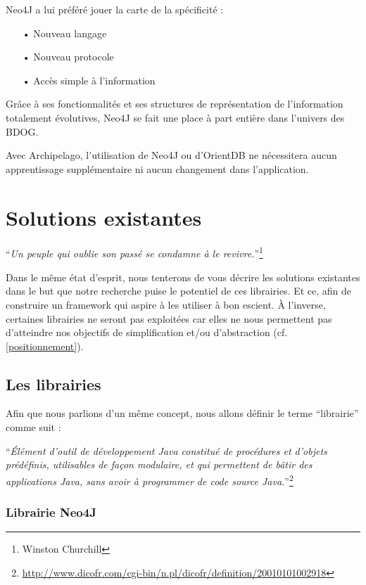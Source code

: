 \documentclass[a4paper,fleqn,12pt,oneside]{book}
\begin{document}
Neo4J a lui préféré jouer la carte de la spécificité :
\begin{itemize}
\item[•] Nouveau langage
\item[•] Nouveau protocole
\item[•] Accès simple à l'information
\end{itemize}
Grâce à ses fonctionnalités et ses structures de représentation de l'information totalement évolutives, Neo4J se fait une place à part entière dans l'univers des BDOG.

Avec Archipelago, l'utilisation de Neo4J ou d'OrientDB ne nécessitera aucun apprentissage supplémentaire ni aucun changement dans l'application.

\chapter{Solutions existantes}
\begin{center}
\enquote{\textit{Un peuple qui oublie son passé se condamne à le revivre.}}\footnote{Winston Churchill}
\end{center}

Dans le même état d'esprit, nous tenterons de vous décrire les solutions existantes dans le but que notre recherche puise le potentiel de ces librairies. Et ce, afin de construire un framework qui aspire à les utiliser à bon escient.  À l'inverse, certaines librairies ne seront pas exploitées car elles ne nous permettent pas d'atteindre nos objectifs de simplification et/ou d'abstraction (cf. \ref{positionnement}).

\section{Les librairies} 
\label{librairie}
Afin que nous parlions d'un même concept, nous allons définir le terme \enquote{librairie} comme suit : 

\enquote{\textit{Élément d'outil de développement Java constitué de procédures et d'objets prédéfinis, utilisables de façon modulaire, et qui permettent de bâtir des applications Java, sans avoir à programmer de code source Java.}}\footnote{\url{http://www.dicofr.com/cgi-bin/n.pl/dicofr/definition/20010101002918}}


\subsection{Librairie Neo4J}
\end{document}
